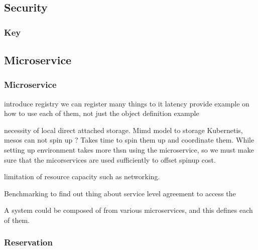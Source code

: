 \documentclass[10pt]{article}
\begin{document}
\subsection{Security}

\subsubsection{Key}


\subsection{Microservice}

\subsubsection{Microservice}

 
introduce registry we can register many things to it 
latency 
provide example on how to use each of them, not just the object definition example 
 
necessity of local direct attached storage. 
Mimd model to storage  
Kubernetis, mesos can not spin up ?  
Takes time to spin them up and coordinate them. While setting up environment takes more thsn using the microservice, so we must make sure that the micorservices are used sufficiently to offset spinup cost. 
 
limitation of resource capacity such as networking. 
 
Benchmarking to find out thing about service level agreement to access
the 


A system could be composed of from various microservices, and this defines
each of them.



\subsubsection{Reservation}
\end{document}
